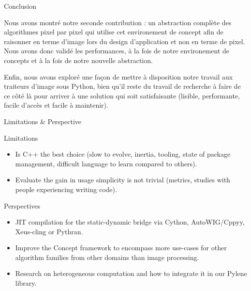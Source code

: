 \documentclass[12pt,aspectratio=169]{beamer}
\begin{document}
\begin{frame}{Conclusion}
{    Nous avons montré notre seconde contribution : un abstraction complète des algorithmes pixel par pixel qui utilise cet environement de concept afin de raisonner en terme d'image lors du design d'application et non en terme de pixel.
    Nous avons donc validé les performances, à la fois de notre environement de concepts et à la fois de notre nouvelle abstraction.
    
    Enfin, nous avons exploré une façon de mettre à disposition notre travail aux traiteurs d'image sous Python, bien qu'il reste du travail de recherche à faire de ce côté là pour arriver à une solution qui soit satisfaisante (lisible, performante, facile d'accès et facile à maintenir).
  }
\end{frame}

\begin{frame}{Limitations \& Perspective}
  \begin{alertblock}{Limitations}
    \footnotesize
    \begin{itemize}
      \item Is C++ the best choice (slow to evolve, inertia, tooling, state of package management, difficult language
            to learn compared to others).
      \item Evaluate the gain in usage simplicity is not trivial (metrics, studies with people experiencing writing
            code).
    \end{itemize}
  \end{alertblock}
  \begin{alertblock}{Perspectives}
    \footnotesize
    \begin{itemize}
      \item JIT compilation for the static-dynamic bridge via Cython, AutoWIG/Cppyy, Xeus-cling or Pythran.
      \item Improve the Concept framework to encompass more use-cases for other algorithm families from other domains
            than image processing.
      \item Research on heterogeneous computation and how to integrate it in our Pylene library.
    \end{itemize}
  \end{alertblock}

\end{frame}
\end{document}
